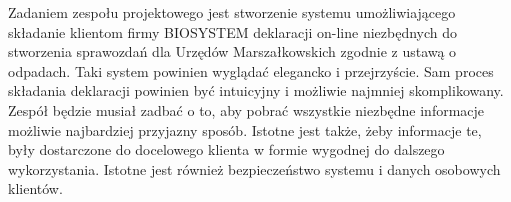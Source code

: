 

Zadaniem zespołu projektowego jest stworzenie systemu umożliwiającego składanie klientom firmy BIOSYSTEM deklaracji on-line niezbędnych do stworzenia sprawozdań dla Urzędów Marszałkowskich zgodnie z ustawą o odpadach.
Taki system powinien wyglądać elegancko i przejrzyście. Sam proces składania deklaracji powinien być intuicyjny i możliwie najmniej skomplikowany. Zespół będzie musiał zadbać o to, aby pobrać wszystkie niezbędne informacje możliwie najbardziej przyjazny sposób. Istotne jest także, żeby informacje te, były dostarczone do docelowego klienta w formie wygodnej do dalszego wykorzystania.
Istotne jest również bezpieczeństwo systemu i danych osobowych klientów. 